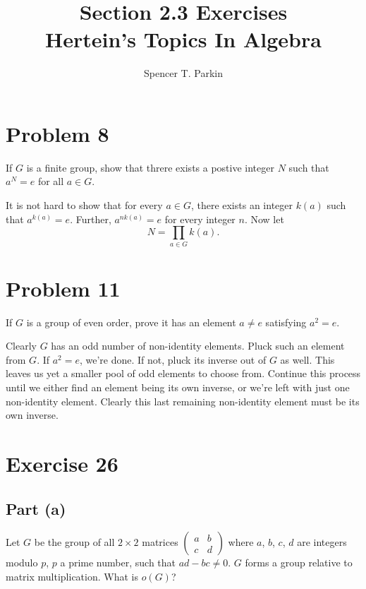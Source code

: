 \documentclass[12pt]{article}
\title{Section 2.3 Exercises\\Hertein's Topics In Algebra}
\author{Spencer T. Parkin}
\begin{document}
\maketitle

\section*{Problem 8}

If $G$ is a finite group, show that threre exists a postive integer $N$ such that $a^N=e$
for all $a\in G$.

It is not hard to show that for every $a\in G$, there exists an integer $k(a)$ such that $a^{k(a)}=e$.
Further, $a^{nk(a)}=e$ for every integer $n$.  Now let
\begin{equation*}
N=\prod_{a\in G} k(a).
\end{equation*}

\section*{Problem 11}

If $G$ is a group of even order, prove it has an element $a\neq e$ satisfying $a^2=e$.

Clearly $G$ has an odd number of non-identity elements.  Pluck such an element from $G$.
If $a^2=e$, we're done.  If not, pluck its inverse out of $G$ as well.  This leaves us yet
a smaller pool of odd elements to choose from.  Continue this process until we either find an
element being its own inverse, or we're left with just one non-identity element.  Clearly this
last remaining non-identity element must be its own inverse.

\section*{Exercise 26}

\subsection*{Part (a)}

Let $G$ be the group of all $2\times 2$ matrices $\left(\begin{array}{cc}a&b\\c&d\end{array}\right)$
where $a$, $b$, $c$, $d$ are integers modulo $p$, $p$ a prime number, such that $ad-bc\neq 0$.
$G$ forms a group relative to matrix multiplication.  What is $o(G)$?
\end{document}

